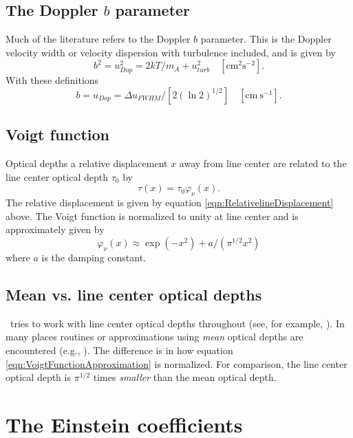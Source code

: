 \subsection{The Doppler $b$ parameter}

Much of the literature refers to the Doppler $b$ parameter.
This is the
Doppler velocity width or velocity dispersion with turbulence included,
and is given by
\begin{equation}
{b^2} = u_{Dop}^2 = 2kT/{m_A} + u_{turb}^2
\quad [\mathrm{cm}^2 \mathrm{s}^{-2}].
\end{equation}
With these definitions
\begin{equation}
b = {u_{Dop}} = \Delta {u_{FWHM}}/\left[ {2{{\left( {\ln 2} \right)}^{1/2}}}
\right]
\quad  [\mathrm{cm~s}^{-1}].
\end{equation}

\subsection{Voigt function}

Optical depths a relative displacement $x$ away from line center
are related
to the line center optical depth $\tau_0$ by
\begin{equation}
\tau (x)=\tau_0 \varphi_\nu (x).%
\end{equation}
The relative displacement is given by
equation \ref{eqn:RelativelineDisplacement} above.
The Voigt function
is normalized to unity at line center and is approximately given by
\begin{equation}
\label{eqn:VoigtFunctionApproximation}
{\varphi _\nu }(x) \approx \exp ( - {x^2}) + a/({\pi ^{1/2}}{x^2})
\end{equation}
where $a$ is the damping constant.

\subsection{Mean vs. line center optical depths}

\Cloudy\ tries to work with line center optical depths throughout (see,
for example, \citealp{Mihalas1978}).
In many places routines or approximations using
\emph{mean} optical depths are encountered
(e.g., \citealp{Hummer1980}).
The difference is in how
equation \ref{eqn:VoigtFunctionApproximation} is normalized.
For comparison, the line
center optical depth is $\pi^{1/2}$ times \emph{smaller} than
the mean optical depth.

\section{The Einstein coefficients}

